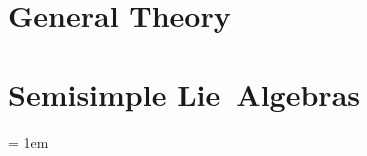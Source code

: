 \documentclass{scrbook}
\begin{document}
\frontmatter
  \maketitle
  
  \tableofcontents
  

\mainmatter
  \part{General Theory}
  
  
  
  
  
  
  
  \part{Semisimple Lie~Algebras}
  
  
  

% 
\backmatter
  \emergencystretch = 1em %
  \printbibliography
\end{document}
